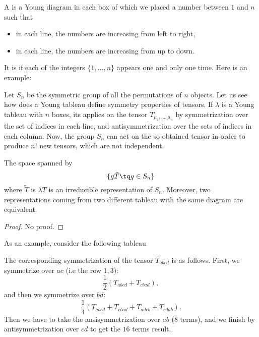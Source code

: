 A  is a Young diagram in each box of which we placed a number between $1$ and $n$ such that
\begin{itemize}
	\item in each line, the numbers are increasing from left to right,
	\item in each line, the numbers are increasing from up to down.
\end{itemize}
It is  if each of the integers $\{ 1,\ldots,n \}$ appears one and only one time. Here is an example:
%	
\begin{center}
   
\end{center}
Let $S_n$ be the symmetric group of all the permutations of $n$ objects. Let us see how does a Young tableau define symmetry properties of tensors. If $\lambda$ is a Young tableau with $n$ boxes, its applies on the tensor $T_{\mu_1,\ldots,\mu_n}$ by symmetrization over the set of indices in each line, and antisymmetrization over the sets of indices in each column. Now, the group $S_n$ can act on the so-obtained tensor in order to produce $n!$ new tensors, which are not independent.

\begin{lemma}
The space spanned by
\begin{equation}
	\{ g \tilde T\tq g\in S_n \}
\end{equation}
where $\tilde T$ is $\lambda T$ is an irreducible representation of $S_n$. Moreover, two representations coming from two different tableau with the same diagram are equivalent.
\end{lemma}
\begin{proof}
	No proof.
\end{proof}
As an example, consider the following tableau
%	
\begin{center}
   
\end{center}
The corresponding symmetrization of the tensor $T_{abcd}$ is as follows. First, we symmetrize over $ac$ (i.e the row $1,3$):
\begin{equation}
\frac{ 1 }{2}(	T_{abcd}+T_{cbad}),
\end{equation}
and then we symmetrize over $bd$:
\begin{equation}
	\frac{1}{ 4 }(T_{abcd}+T_{cbad}+T_{adcb}+T_{cdab}).
\end{equation}
Then we have to take the ansisymmetrization over $ab$ ($8$ terms), and we finish by antisymmetrization over $cd$ to get the $16$ terms result.

